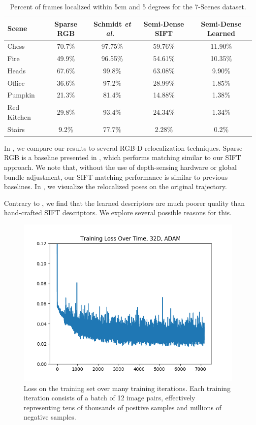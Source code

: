 \begin{table}[h]
	\begin{tabular} { l | c c c c}
		Scene & Sparse RGB \cite{shotton2013scene} & Schmidt \textit{et al}.\ \cite{schmidt2017self} & Semi-Dense SIFT & Semi-Dense Learned \\
		\hline
	Chess       & 70.7\% & 97.75\% & 59.76\% & 11.90\% \\
	Fire        & 49.9\% & 96.55\% & 54.61\% & 10.35\% \\
	Heads       & 67.6\% & 99.8\%  & 63.08\% & 9.90\% \\
	Office      & 36.6\% & 97.2\%  & 28.99\% & 1.85\% \\
	Pumpkin     & 21.3\% & 81.4\%  & 14.88\% & 1.38\% \\
	Red Kitchen & 29.8\% & 93.4\%  & 24.34\% & 1.34\% \\
	Stairs      &  9.2\% & 77.7\%  &  2.28\% & 0.2\% \\
	\end{tabular}
	\caption{Percent of frames localized within 5cm and 5 degrees for the 7-Scenes dataset.}
	\label{tab:7scenes-reloc}
\end{table}

In , we compare our results to several RGB-D relocalization techniques. Sparse RGB is a baseline presented in \cite{shotton2013scene}, which performs matching similar to our SIFT approach. We note that, without the use of depth-sensing hardware or global bundle adjustment, our SIFT matching performance is similar to previous baselines. In , we visualize the relocalized poses on the original trajectory.

Contrary to \cite{schmidt2017self}, we find that the learned descriptors are much poorer quality than hand-crafted SIFT descriptors. We explore several possible reasons for this.

\begin{figure}[h]
	\centering
	\includegraphics[width=0.8\linewidth]{experiments/trainingiters_32d.png}
	\caption{Loss on the training set over many training iterations. Each training iteration consists of a batch of 12 image pairs, effectively representing tens of thousands of positive samples and millions of negative samples.}
	\label{fig:trainingiters_32d}
\end{figure}

